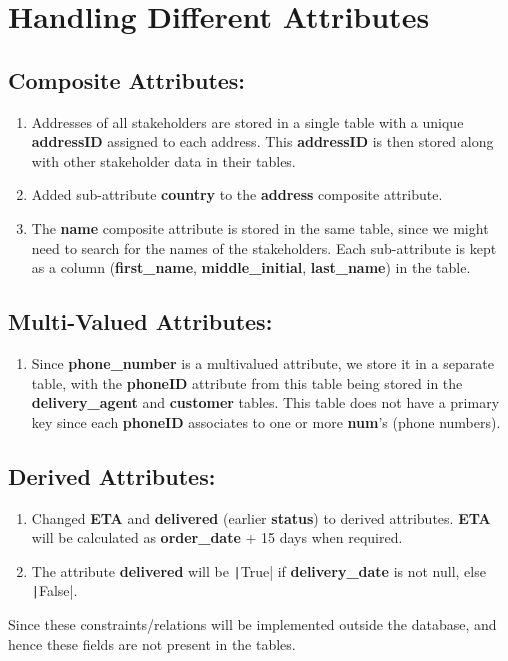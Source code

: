 \section*{\Huge Handling Different Attributes}
\subsection*{Composite Attributes:}
\begin{enumerate}
    \item
    Addresses of all stakeholders are stored in a single table with a unique \textbf{addressID} assigned to each address.
    This \textbf{addressID} is then stored along with other stakeholder data in their tables.
    \item
    Added sub-attribute \textbf{country} to the \textbf{address} composite attribute.
    \item
    The \textbf{name} composite attribute is stored in the same table, since we might need to search for the names of the stakeholders.
    Each sub-attribute is kept as a column (\textbf{first\_name}, \textbf{middle\_initial}, \textbf{last\_name}) in the table.
\end{enumerate}

\subsection*{Multi-Valued Attributes:}
\begin{enumerate}
    \item
    Since \textbf{phone\_number} is a multivalued attribute, we store it in a separate table, with the \textbf{phoneID} attribute
    from this table being stored in the \textbf{delivery\_agent} and \textbf{customer} tables.
    This table does not have a primary key since each \textbf{phoneID} associates to one or more \textbf{num}'s (phone numbers).
\end{enumerate}

\subsection*{Derived Attributes:}
\begin{enumerate}
    \item
    Changed \textbf{ETA} and \textbf{delivered} (earlier \textbf{status}) to derived attributes.
    \textbf{ETA} will be calculated as \textbf{order\_date} + 15 days when required.
    \item
    The attribute \textbf{delivered} will be \texttt|True| if \textbf{delivery\_date} is not null, else \texttt|False|.
\end{enumerate}
Since these constraints/relations will be implemented outside the database, and hence these fields are not present in the tables.

